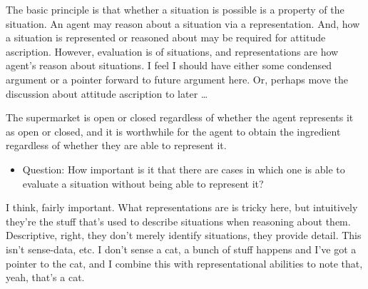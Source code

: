 \documentclass[10pt]{article}
\begin{document}

The basic principle is that whether a situation is possible is a property of the situation.
An agent may reason about a situation via a representation.
And, how a situation is represented or reasoned about may be required for attitude ascription.
However, evaluation is of situations, and representations are how agent's reason about situations.
{\color{red} I feel I should have either some condensed argument or a pointer forward to future argument here.
  Or, perhaps move the discussion about attitude ascription to later \dots}

The supermarket is open or closed regardless of whether the agent represents it as open or closed, and it is worthwhile for the agent to obtain the ingredient regardless of whether they are able to represent it.



\newpage

\begin{itemize}
\item Question: How important is it that there are cases in which one is able to evaluate a situation without being able to represent it?
\end{itemize}
I think, fairly important.
What representations are is tricky here, but intuitively they're the stuff that's used to describe situations when reasoning about them.
Descriptive, right, they don't merely identify situations, they provide detail.
This isn't sense-data, etc.
I don't sense a cat, a bunch of stuff happens and I've got a pointer to the cat, and I combine this with representational abilities to note that, yeah, that's a cat.
\end{document}
